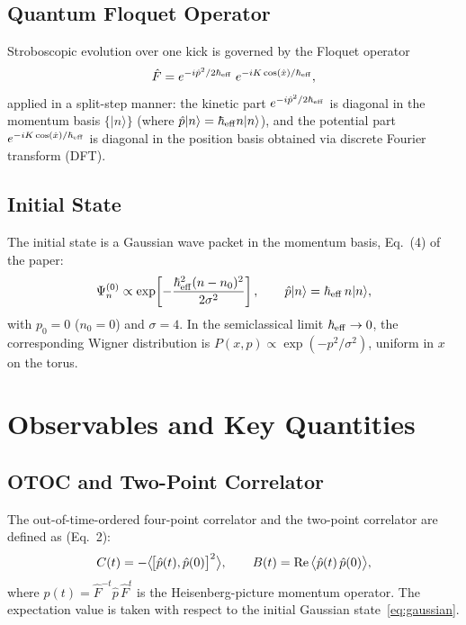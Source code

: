 \documentclass[11pt,a4paper]{article}
\newcommand{\hb}{\hbar_{\rm eff}}
\begin{document}
\subsection{Quantum Floquet Operator}

Stroboscopic evolution over one kick is governed by the Floquet operator
\begin{equation}\label{eq:floquet}
\hat{F}=e^{-i\hat{p}^{2}/2\hb}\;e^{-iK\cos(\hat{x})/\hb},
\end{equation}
applied in a split-step manner: the kinetic part $e^{-i\hat{p}^{2}/2\hb}$ is diagonal in the momentum basis $\{|n\rangle\}$ (where $\hat{p}|n\rangle=\hb n|n\rangle$), and the potential part $e^{-iK\cos(\hat{x})/\hb}$ is diagonal in the position basis obtained via discrete Fourier transform (DFT).

\subsection{Initial State}

The initial state is a Gaussian wave packet in the momentum basis, Eq.~(4) of the paper:
\begin{equation}\label{eq:gaussian}
\Psi^{(0)}_{n}\propto\exp\!\left[-\frac{\hb^{2}(n-n_{0})^{2}}{2\sigma^{2}}\right],\qquad
\hat{p}|n\rangle=\hb\,n|n\rangle,
\end{equation}
with $p_{0}=0$ ($n_{0}=0$) and $\sigma=4$. In the semiclassical limit $\hb\to0$, the corresponding Wigner distribution is $P(x,p)\propto\exp(-p^{2}/\sigma^{2})$, uniform in $x$ on the torus.

\section{Observables and Key Quantities}

\subsection{OTOC and Two-Point Correlator}

The out-of-time-ordered four-point correlator and the two-point correlator are defined as (Eq.~2):
\begin{equation}\label{eq:otoc_def}
C(t)=-\big\langle\!\big[\hat{p}(t),\hat{p}(0)\big]^{2}\big\rangle,\qquad
B(t)={\rm Re}\,\big\langle\hat{p}(t)\,\hat{p}(0)\big\rangle,
\end{equation}
where $\hat{p}(t)=\hat{F}^{-t}\hat{p}\,\hat{F}^{t}$ is the Heisenberg-picture momentum operator. The expectation value is taken with respect to the initial Gaussian state~\eqref{eq:gaussian}.
\end{document}
